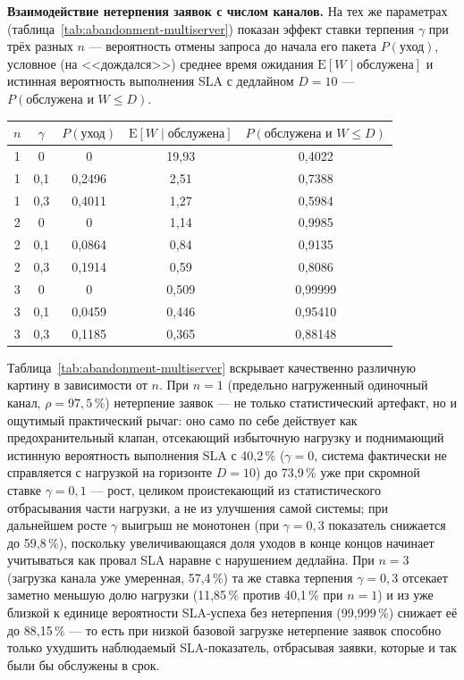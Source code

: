 \documentclass[12pt,a4paper]{article}
\begin{document}
\noindent\textbf{Взаимодействие нетерпения заявок с числом каналов.} На тех же параметрах (таблица~\ref{tab:abandonment-multiserver}) показан эффект ставки терпения $\gamma$ при трёх разных $n$ --- вероятность отмены запроса до начала его пакета $P(\text{уход})$, условное (на <<дождался>>) среднее время ожидания $\mathrm{E}[W\mid\text{обслужена}]$ и истинная вероятность выполнения SLA с дедлайном $D=10$ --- $P(\text{обслужена и }W\le D)$.

\begin{center}
\label{tab:abandonment-multiserver}
\begin{tabular}{|c|c|c|c|c|}
\hline
$n$ & $\gamma$ & $P(\text{уход})$ & $\mathrm{E}[W\mid\text{обслужена}]$ & $P(\text{обслужена и }W\le D)$ \\
\hline
1 & 0    & 0      & 19,93 & 0,4022 \\
1 & 0,1  & 0,2496 & 2,51  & 0,7388 \\
1 & 0,3  & 0,4011 & 1,27  & 0,5984 \\
\hline
2 & 0    & 0      & 1,14 & 0,9985 \\
2 & 0,1  & 0,0864 & 0,84 & 0,9135 \\
2 & 0,3  & 0,1914 & 0,59 & 0,8086 \\
\hline
3 & 0    & 0      & 0,509 & 0,99999 \\
3 & 0,1  & 0,0459 & 0,446 & 0,95410 \\
3 & 0,3  & 0,1185 & 0,365 & 0,88148 \\
\hline
\end{tabular}
\end{center}

Таблица~\ref{tab:abandonment-multiserver} вскрывает качественно различную картину в зависимости от $n$. При $n=1$ (предельно нагруженный одиночный канал, $\rho=97{,}5\,\%$) нетерпение заявок --- не только статистический артефакт, но и ощутимый практический рычаг: оно само по себе действует как предохранительный клапан, отсекающий избыточную нагрузку и поднимающий истинную вероятность выполнения SLA с 40,2\,\% ($\gamma=0$, система фактически не справляется с нагрузкой на горизонте $D=10$) до 73,9\,\% уже при скромной ставке $\gamma=0{,}1$ --- рост, целиком проистекающий из статистического отбрасывания части нагрузки, а не из улучшения самой системы; при дальнейшем росте $\gamma$ выигрыш не монотонен (при $\gamma=0{,}3$ показатель снижается до 59,8\,\%), поскольку увеличивающаяся доля уходов в конце концов начинает учитываться как провал SLA наравне с нарушением дедлайна. При $n=3$ (загрузка канала уже умеренная, 57,4\,\%) та же ставка терпения $\gamma=0{,}3$ отсекает заметно меньшую долю нагрузки (11,85\,\% против 40,1\,\% при $n=1$) и из уже близкой к единице вероятности SLA-успеха без нетерпения (99,999\,\%) снижает её до 88,15\,\% --- то есть при низкой базовой загрузке нетерпение заявок способно только ухудшить наблюдаемый SLA-показатель, отбрасывая заявки, которые и так были бы обслужены в срок.
\end{document}
